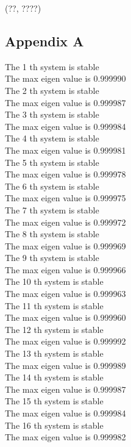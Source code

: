 \documentclass[11pt]{article}
\begin{document}
(??, ????)
\newpage
\begin{LATEX}
\printbibliography
\end{LATEX}
\newpage
\subsection{Appendix A}
\label{sec:org5ab6351}
The 1 th system is stable \\
The max eigen value is 0.999990 \\
The 2 th system is stable \\
The max eigen value is 0.999987 \\
The 3 th system is stable \\
The max eigen value is 0.999984 \\
The 4 th system is stable \\
The max eigen value is 0.999981 \\
The 5 th system is stable \\
The max eigen value is 0.999978 \\
The 6 th system is stable \\
The max eigen value is 0.999975 \\
The 7 th system is stable \\
The max eigen value is 0.999972 \\
The 8 th system is stable \\
The max eigen value is 0.999969 \\
The 9 th system is stable \\
The max eigen value is 0.999966 \\
The 10 th system is stable \\
The max eigen value is 0.999963 \\
The 11 th system is stable \\
The max eigen value is 0.999960 \\
The 12 th system is stable \\
The max eigen value is 0.999992 \\
The 13 th system is stable \\
The max eigen value is 0.999989 \\
The 14 th system is stable \\
The max eigen value is 0.999987 \\
The 15 th system is stable \\
The max eigen value is 0.999984 \\
The 16 th system is stable \\
The max eigen value is 0.999982 \\
\end{document}
